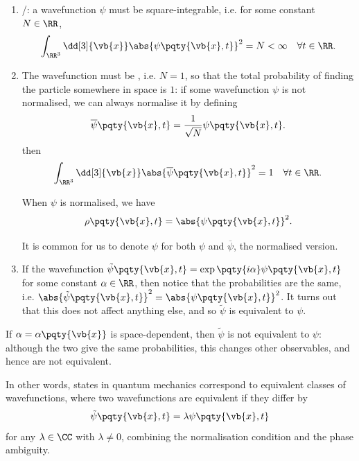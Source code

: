\begin{enumerate}[label=(\roman*)]
    \item {}/: a wavefunction \(\psi\) must be square-integrable, i.e. for some constant \(N \in \RR\),
    \begin{equation}
        \int_{\RR^3} \dd[3]{\vb{x}} \abs{\psi\pqty{\vb{x}, t}}^2 = N < \infty \quad \forall t \in \RR.
    \end{equation}

    \item The wavefunction must be , i.e. \(N = 1\), so that the total probability of finding the particle somewhere in space is \(1\): if some wavefunction \(\psi\) is not normalised, we can always normalise it by defining
    \begin{equation}
        \overline{\psi}\pqty{\vb{x}, t} = \frac{1}{\sqrt{N}} \psi\pqty{\vb{x}, t}.
    \end{equation}
    then
    \begin{equation}
        \int_{\RR^3} \dd[3]{\vb{x}} \abs{\overline{\psi}\pqty{\vb{x}, t}}^2 = 1 \quad \forall t \in \RR.
    \end{equation}

    When \(\psi\) is normalised, we have
    \begin{equation}
        \rho\pqty{\vb{x}, t} = \abs{\psi\pqty{\vb{x}, t}}^2.
    \end{equation}

    It is common for us to denote \(\psi\) for both \(\psi\) and \(\overline{\psi}\), the normalised version.

    \item If the wavefunction \(\tilde{\psi} \pqty{\vb{x}, t} = \exp\pqty{i \alpha} \psi\pqty{\vb{x}, t}\) for some constant \(\alpha \in \RR\), then notice that the probabilities are the same, i.e. \(\abs{\tilde{\psi}\pqty{\vb{x}, t}}^2 = \abs{\psi\pqty{\vb{x}, t}}^2\). It turns out that this does not affect anything else, and so \(\tilde{\psi}\) is equivalent to \(\psi\).
\end{enumerate}

\begin{remark}
    If \(\alpha = \alpha\pqty{\vb{x}}\) is space-dependent, then \(\tilde{\psi}\) is not equivalent to \(\psi\): although the two give the same probabilities, this changes other observables, and hence are not equivalent.
\end{remark}

In other words, states in quantum mechanics correspond to equivalent classes of wavefunctions, where two wavefunctions are equivalent if they differ by
\[
    \tilde{\psi} \pqty{\vb{x}, t} = \lambda \psi\pqty{\vb{x}, t}
\]
for any \(\lambda \in \CC\) with \(\lambda \neq 0\), combining the normalisation condition and the phase ambiguity.

